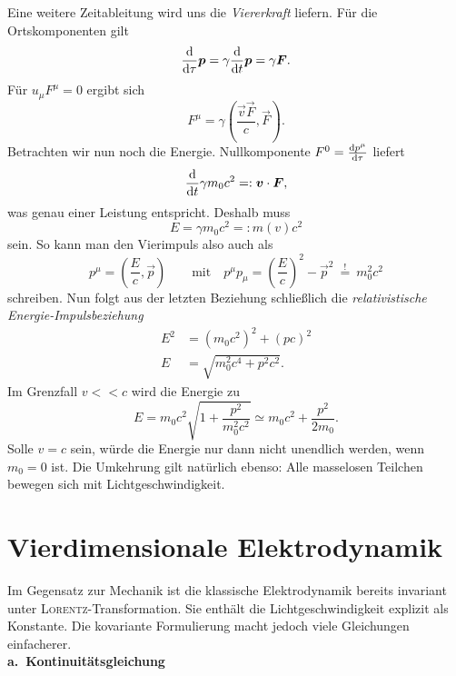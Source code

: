 Eine weitere Zeitableitung wird uns die \emph{Viererkraft} liefern. Für die Ortskomponenten gilt
\begin{equation*}
\frac{\mathrm{d}{}}{\mathrm{d}{\tau}}\bm{p}=\gamma\frac{\mathrm{d}{}}{\mathrm{d}{t}}\bm{p}=\gamma\bm{F}.
\end{equation*}
Für $u_\mu F^\mu =0$ ergibt sich
\begin{equation*}
F^\mu = \gamma\left(\frac{\vec{v}\vec{F}}{c},\vec{F}\right).
\end{equation*}
Betrachten wir nun noch die Energie. Nullkomponente $F^0 = \frac{\mathrm{d}{p^\mu}}{\mathrm{d}{\tau}}$ liefert
\begin{equation*}
\frac{\mathrm{d}{}}{\mathrm{d}{t}}\gamma m_0c^2 =:\bm{v}\cdot\bm{F},
\end{equation*}
was genau einer Leistung entspricht. Deshalb muss 
\begin{equation*}
E = \gamma m_0 c^2 =: m(v)c^2
\end{equation*}
sein. So kann man den Vierimpuls also auch als
\begin{equation*}
p^\mu =\left(\frac{E}{c},\vec{p}\right)\qquad\text{mit}\quad p^\mu p_\mu = \left(\frac{E}{c}\right)^2 - \vec{p}^2 \ \stackrel{!}{=}\ m_0^2c^2
\end{equation*}
schreiben. Nun folgt aus der letzten Beziehung schließlich die \emph{relativistische Energie-Impulsbeziehung}
\begin{align*}
E^2 &= \left(m_0c^2\right)^2 + \left(p c\right)^2\\
E &= \sqrt{m_0^2c^4 + p^2c^2}.
\end{align*}
Im Grenzfall $v<<c$ wird die Energie zu
\begin{equation*}
E = m_0c^2\sqrt{1+\frac{p^2}{m_0^2c^2}} \simeq m_0c^2 + \frac{p^2}{2m_0}.
\end{equation*}
Solle $v=c$ sein, würde die Energie nur dann nicht unendlich werden, wenn $m_0=0$ ist. Die Umkehrung gilt natürlich ebenso: Alle masselosen Teilchen bewegen sich mit Lichtgeschwindigkeit.

\section{Vierdimensionale Elektrodynamik}

Im Gegensatz zur Mechanik ist die klassische Elektrodynamik bereits invariant unter \textsc{Lorentz}-Transformation. Sie enthält die Lichtgeschwindigkeit explizit als Konstante. Die kovariante Formulierung macht jedoch viele Gleichungen einfacherer.\\

\textbf{a.\ Kontinuitätsgleichung}\\ 

